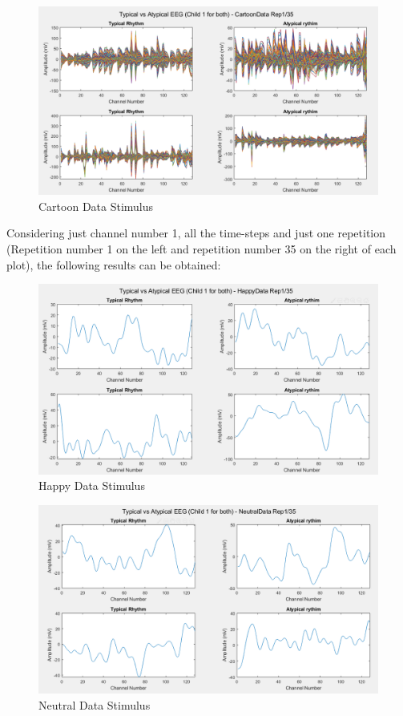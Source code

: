 \begin{appendices}
\clearpage

\begin{figure}[ht!]%
    \centering
    \includegraphics[width=14cm]{images/matplot5}%
    \caption{Cartoon Data Stimulus}%
\end{figure}

Considering just channel number 1, all the time-steps and just one repetition (Repetition number 1 on the left and repetition number 35 on the right of each plot), the following results can be obtained: 
\vspace{\floatsep}

\begin{figure}[ht!]%
    \centering
    \includegraphics[width=14cm]{images/matplot6}%
    \caption{Happy Data Stimulus}%
\end{figure}

\begin{figure}[ht!]%
    \centering
    \includegraphics[width=14cm]{images/matplot7}%
    \caption{Neutral Data Stimulus}%
\end{figure}


\end{appendices}
